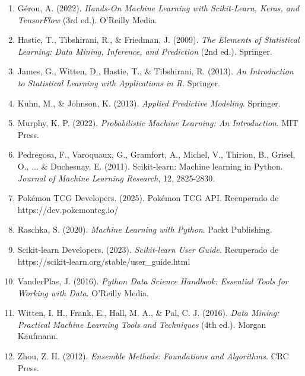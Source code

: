 \documentclass[12pt,letterpaper]{article}
\begin{document}
\begin{enumerate}
    \item Géron, A. (2022). \textit{Hands-On Machine Learning with Scikit-Learn, Keras, and TensorFlow} (3rd ed.). O'Reilly Media.
    
    \item Hastie, T., Tibshirani, R., \& Friedman, J. (2009). \textit{The Elements of Statistical Learning: Data Mining, Inference, and Prediction} (2nd ed.). Springer.
    
    \item James, G., Witten, D., Hastie, T., \& Tibshirani, R. (2013). \textit{An Introduction to Statistical Learning with Applications in R}. Springer.
    
    \item Kuhn, M., \& Johnson, K. (2013). \textit{Applied Predictive Modeling}. Springer.
    
    \item Murphy, K. P. (2022). \textit{Probabilistic Machine Learning: An Introduction}. MIT Press.
    
    \item Pedregosa, F., Varoquaux, G., Gramfort, A., Michel, V., Thirion, B., Grisel, O., ... \& Duchesnay, E. (2011). Scikit-learn: Machine learning in Python. \textit{Journal of Machine Learning Research}, 12, 2825-2830.
    
    \item Pokémon TCG Developers. (2025). Pokémon TCG API. Recuperado de https://dev.pokemontcg.io/
    
    \item Raschka, S. (2020). \textit{Machine Learning with Python}. Packt Publishing.
    
    \item Scikit-learn Developers. (2023). \textit{Scikit-learn User Guide}. Recuperado de https://scikit-learn.org/stable/user\_guide.html
    
    \item VanderPlas, J. (2016). \textit{Python Data Science Handbook: Essential Tools for Working with Data}. O'Reilly Media.
    
    \item Witten, I. H., Frank, E., Hall, M. A., \& Pal, C. J. (2016). \textit{Data Mining: Practical Machine Learning Tools and Techniques} (4th ed.). Morgan Kaufmann.
    
    \item Zhou, Z. H. (2012). \textit{Ensemble Methods: Foundations and Algorithms}. CRC Press.
\end{enumerate}
\end{document}
